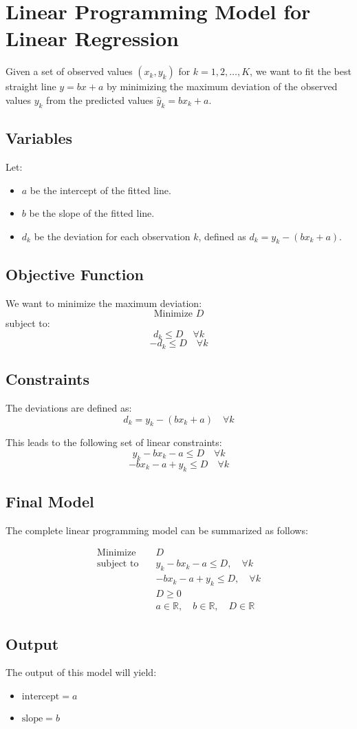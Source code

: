 \documentclass{article}
\begin{document}
\section*{Linear Programming Model for Linear Regression}

Given a set of observed values \( (x_k, y_k) \) for \( k = 1, 2, \ldots, K \), we want to fit the best straight line \( y = bx + a \) by minimizing the maximum deviation of the observed values \( y_k \) from the predicted values \( \hat{y}_k = bx_k + a \).

\subsection*{Variables}
Let:
\begin{itemize}
    \item \( a \) be the intercept of the fitted line.
    \item \( b \) be the slope of the fitted line.
    \item \( d_k \) be the deviation for each observation \( k \), defined as \( d_k = y_k - (bx_k + a) \).
\end{itemize}

\subsection*{Objective Function}
We want to minimize the maximum deviation:
\[
\text{Minimize } D
\]
subject to:
\[
d_k \leq D \quad \forall k
\]
\[
-d_k \leq D \quad \forall k
\]

\subsection*{Constraints}
The deviations are defined as:
\[
d_k = y_k - (bx_k + a) \quad \forall k
\]

This leads to the following set of linear constraints:
\[
y_k - bx_k - a \leq D \quad \forall k
\]
\[
-bx_k - a + y_k \leq D \quad \forall k
\]

\subsection*{Final Model}
The complete linear programming model can be summarized as follows:

\begin{align*}
\text{Minimize} \quad & D \\
\text{subject to} \quad & y_k - bx_k - a \leq D, \quad \forall k \\
& -bx_k - a + y_k \leq D, \quad \forall k \\
& D \geq 0 \\
& a \in \mathbb{R}, \quad b \in \mathbb{R}, \quad D \in \mathbb{R}
\end{align*}

\subsection*{Output}
The output of this model will yield:
\begin{itemize}
    \item \( \text{intercept} = a \)
    \item \( \text{slope} = b \)
\end{itemize}
\end{document}
